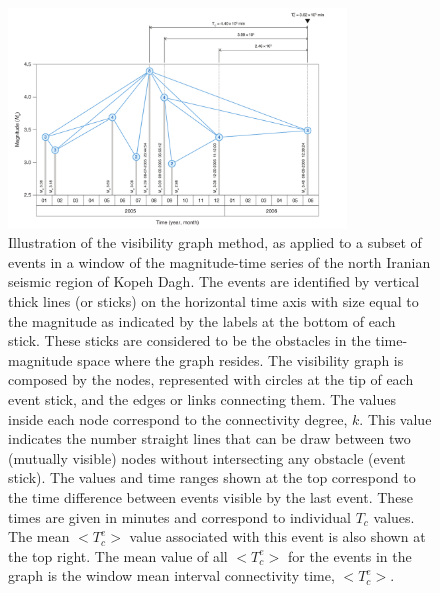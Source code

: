 \begin{figure}[t]
	\centering
	\includegraphics[width=0.8\textwidth]{figures/pdf/figure-01} 
	\caption{Illustration of the visibility graph method, as applied to a subset of events in a window of the magnitude-time series of the north Iranian seismic region of Kopeh Dagh. The events are identified by vertical thick lines (or sticks) on the horizontal time axis with size equal to the magnitude as indicated by the labels at the bottom of each stick. These sticks are considered to be the obstacles in the time-magnitude space where the graph resides. The visibility graph is composed by the nodes, represented with circles at the tip of each event stick, and the edges or links connecting them. The values inside each node correspond to the connectivity degree, $k$. This value indicates the number straight lines that can be draw between two (mutually visible) nodes without intersecting any obstacle (event stick). The values and time ranges shown at the top correspond to the time difference between events visible by the last event. These times are given in minutes and correspond to individual $T_c$ values. The mean $<$$T_c^e$$>$ value associated with this event is also shown at the top right. The mean value of all $<$$T_c^e$$>$ for the events in the graph is the window mean interval connectivity time, $<$$T_c^e$$>$.}
	\label{fig:vg}
\end{figure}


